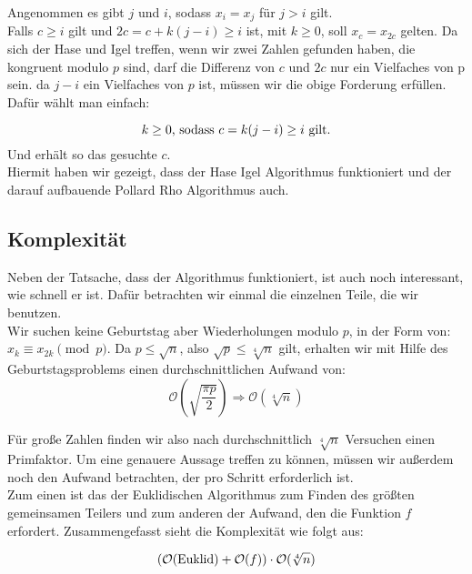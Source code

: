  	\noindent	Angenommen es gibt $j$ und $i$, sodass $x_i=x_j$ f\"ur $j>i$ gilt.\\

	\noindent 	Falls $c\geq i$ gilt und $2c=c+k(j-i)\geq i$ ist, mit $k\geq 0$, soll $x_c=x_{2c}$ gelten. Da sich der Hase und Igel treffen, wenn wir zwei Zahlen gefunden haben, die kongruent modulo $p$ sind, darf die Differenz von $c$ und $2c$ nur ein Vielfaches von p sein. da $j-i$ ein Vielfaches von $p$ ist, m\"ussen wir die obige Forderung erf\"ullen. Daf\"ur w\"ahlt man einfach:

	\[k\geq 0\textnormal{, sodass }c=k(j-i)\geq i \textnormal{ gilt.}\]
	Und erh\"alt so das gesuchte $c$.\\
	
	\noindent Hiermit haben wir gezeigt, dass der Hase Igel Algorithmus funktioniert und der darauf aufbauende Pollard Rho Algorithmus auch.

 	
 	
 	\subsection{Komplexit\"at}
 	Neben der Tatsache, dass der Algorithmus funktioniert, ist auch noch interessant, wie schnell er ist. Daf\"ur betrachten wir einmal die einzelnen Teile, die wir benutzen.\\

 	  	 \noindent Wir suchen keine Geburtstag aber Wiederholungen modulo $p$, in der Form von: $x_k \equiv x_{2k} \pmod p$. Da $p\leq \sqrt{n}$, also $\sqrt{p} \leq \sqrt[4]{n}$ gilt, erhalten wir mit Hilfe des Geburtstagsproblems einen durchschnittlichen Aufwand von:  
 	  	 \[\mathcal O(\sqrt{\frac{\pi p}{2}}) \Rightarrow \mathcal O(\sqrt[4]{n}) \]
 	  	 
 	  	
 	  	\noindent F\"ur gro\ss e Zahlen finden wir also nach durchschnittlich $\sqrt[4]{n}$ Versuchen einen Primfaktor. Um eine genauere Aussage treffen zu k\"onnen, m\"ussen wir au\ss erdem noch den Aufwand betrachten, der pro Schritt erforderlich ist. \\
 	  	Zum einen ist das der Euklidischen Algorithmus zum Finden des gr\"o\ss ten gemeinsamen Teilers und zum anderen der Aufwand, den die Funktion $f$ erfordert. Zusammengefasst sieht die Komplexit\"at wie folgt aus:

 	  	 \[(\mathcal{O}(\textnormal{Euklid})+\mathcal O(f))\cdot\mathcal O(\sqrt[4]{n})\]
	